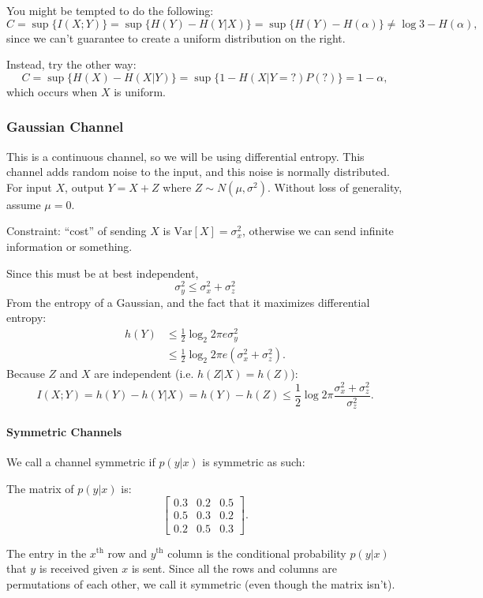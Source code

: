 \documentclass[12pt]{article}
\begin{document}
You might be tempted to do the following:
\[C=\sup\{I(X;Y)\}=\sup\{H(Y)-H(Y|X)\}=\sup\{H(Y)-H(\alpha)\}\ne\log3-H(\alpha),\]
since we can't guarantee to create a uniform distribution on the right.

Instead, try the other way:
\[C=\sup\{H(X)-H(X|Y)\}=\sup\{1-H(X|Y=?)P(?)\}=1-\alpha,\] which occurs when $X$ is uniform.



\subsubsection{Gaussian Channel}
This is a continuous channel, so we will be using differential entropy. This channel adds random noise to the input, and this noise is normally distributed. For input $X$, output $Y = X + Z$ where $Z \sim N(\mu, \sigma^2)$. Without loss of generality, assume $\mu = 0$.

Constraint: ``cost'' of sending $X$ is $\text{Var}[X] = \sigma_x^2$, otherwise we can send infinite information or something.

Since this must be at best independent, 
\[\sigma_y^2\le\sigma_x^2+\sigma_z^2\]
From the entropy of a Gaussian, and the fact that it maximizes differential entropy:
\begin{align*}h(Y) &\le \frac{1}{2} \log_2 2 \pi e \sigma_y^2 \\
 &\le \frac{1}{2} \log_2 2 \pi e (\sigma_x^2 + \sigma_z^2).
\end{align*}
Because $Z$ and $X$ are independent (i.e. $h(Z|X) = h(Z)$):
\[I(X;Y)=h(Y)-h(Y|X)=h(Y)-h(Z)\le\frac{1}{2}\log 2\pi\frac{\sigma_x^2+\sigma_z^2}{\sigma_z^2}.\]


\paragraph{Symmetric Channels}
We call a channel symmetric if $p(y|x)$ is symmetric as such:

The matrix of $p(y|x)$ is:
\[\begin{bmatrix}
    0.3&0.2&0.5\\
    0.5&0.3&0.2\\
    0.2&0.5&0.3
\end{bmatrix}.\]

The entry in the $x^\text{th}$ row and $y^\text{th}$ column is the conditional probability $p(y|x)$ that $y$ is received given $x$ is sent. Since all the rows and columns are permutations of each other, we call it symmetric (even though the matrix isn't).
\end{document}
